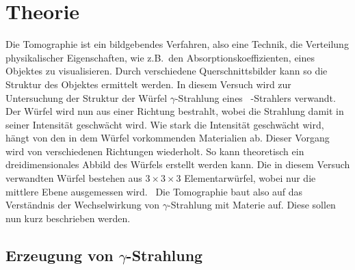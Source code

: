 

\section{Theorie}

Die Tomographie ist ein bildgebendes Verfahren, also eine Technik, die
Verteilung physikalischer Eigenschaften, wie z.B.~den Absorptionskoeffizienten,
eines Objektes zu visualisieren. Durch verschiedene Querschnittsbilder kann so
die Struktur des Objektes ermittelt werden. In diesem Versuch wird zur
Untersuchung der Struktur der Würfel $\gamma$-Strahlung eines
\Cs~-Strahlers verwandt.
Der Würfel wird nun aus einer Richtung bestrahlt, wobei die Strahlung damit in
seiner Intensität geschwächt wird.
Wie stark die Intensität geschwächt wird, hängt von
den in dem Würfel vorkommenden Materialien ab. Dieser Vorgang wird von
verschiedenen Richtungen wiederholt.
So kann theoretisch ein dreidimensionales Abbild des
Würfels erstellt werden kann. Die in diesem Versuch verwandten Würfel bestehen
aus $3\times 3 \times 3$ Elementarwürfel, wobei nur die mittlere Ebene
ausgemessen wird.~\cite{AP} Die Tomographie baut also auf das Verständnis der
Wechselwirkung von $\gamma$-Strahlung mit Materie auf.
Diese sollen nun kurz beschrieben werden.

\subsection{Erzeugung von $\gamma$-Strahlung}
\label{sub:erzeugung_von_gamma_strahlung}

